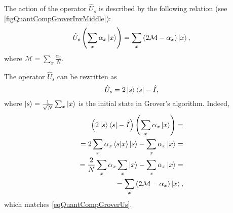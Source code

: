 

The action of the operator $\hat{U}_s$ is described by the following relation (see \autoref{figQuantCompGroverInvMiddle}):
\begin{equation}
\hat{U}_s\left(\sum_x \alpha_x \ket{x}\right) = 
\sum_x \left(2 \mathcal{M} - \alpha_x \right)\ket{x},
\label{eqQuantCompGroverUs}
\end{equation} 
where $\mathcal{M} = \sum_x \frac{\alpha_x}{N}$.

The operator $\hat{U}_s$ can be rewritten as
\begin{equation}
\hat{U}_s = 
2 \ket{s}\bra{s} - \hat{I},
\nonumber
\end{equation}
where $\ket{s}=\frac{1}{\sqrt{N}}\sum_x \ket{x}$ is the initial state in Grover's algorithm.
Indeed,
\begin{eqnarray}
\left(2 \ket{s}\bra{s} - \hat{I}\right)
\left(\sum_x \alpha_x \ket{x}\right) =
\nonumber \\
=  2 \sum_x \alpha_x \bra{s}\ket{x} \ket{s} 
- \sum_x \alpha_x \ket{x} = 
\nonumber \\
=
\frac{2}{N} \sum_x \alpha_x \sum_x \ket{x} -
\sum_x \alpha_x \ket{x} = 
\nonumber \\
= \sum_x \left( 2 \mathcal{M} -\alpha_x \right) \ket{x},
\nonumber
\end{eqnarray}
which matches \eqref{eqQuantCompGroverUs}.




